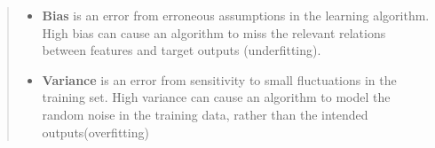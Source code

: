 \documentclass[11pt]{article}
\begin{document}
\begin{quote}
\begin{itemize}
\item \textbf{Bias} is an error from erroneous assumptions in the learning algorithm. High bias can cause an algorithm to miss the relevant relations between features and target outputs (underfitting).
\item \textbf{Variance} is an error from sensitivity to small fluctuations in the training set. High variance can cause an algorithm to model the random noise in the training data, rather than the intended outputs(overfitting)
\end{itemize}
\end{quote}
\end{document}
